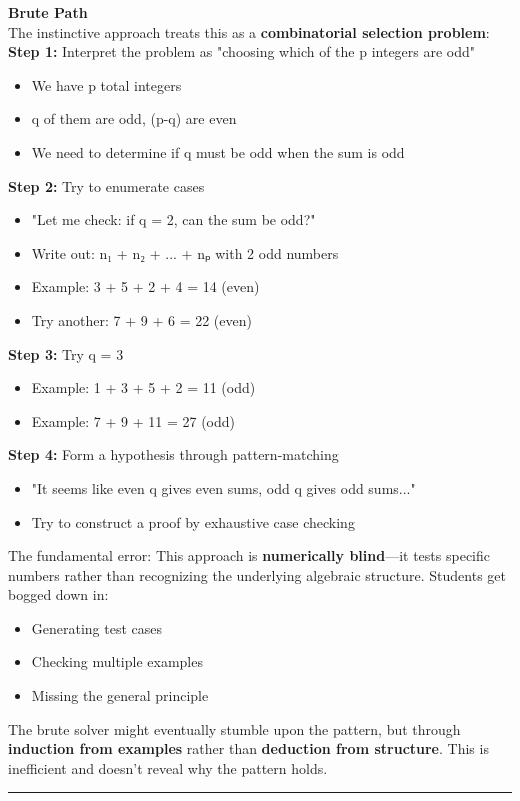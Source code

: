 \documentclass{article}
\begin{document}
\noindent \textbf{Brute Path} \\
The instinctive approach treats this as a \textbf{combinatorial selection problem}: \\
\textbf{Step 1:} Interpret the problem as "choosing which of the p integers are odd"
\begin{itemize}
    \item We have p total integers
    \item q of them are odd, (p-q) are even
    \item We need to determine if q must be odd when the sum is odd
\end{itemize}
\textbf{Step 2:} Try to enumerate cases
\begin{itemize}
    \item "Let me check: if q = 2, can the sum be odd?"
    \item Write out: n₁ + n₂ + ... + nₚ with 2 odd numbers
    \item Example: 3 + 5 + 2 + 4 = 14 (even) \texttimes
    \item Try another: 7 + 9 + 6 = 22 (even) \texttimes
\end{itemize}
\textbf{Step 3:} Try q = 3
\begin{itemize}
    \item Example: 1 + 3 + 5 + 2 = 11 (odd) \checkmark
    \item Example: 7 + 9 + 11 = 27 (odd) \checkmark
\end{itemize}
\textbf{Step 4:} Form a hypothesis through pattern-matching
\begin{itemize}
    \item "It seems like even q gives even sums, odd q gives odd sums..."
    \item Try to construct a proof by exhaustive case checking
\end{itemize}
The fundamental error: This approach is \textbf{numerically blind}—it tests specific numbers rather than recognizing the underlying algebraic structure. Students get bogged down in:
\begin{itemize}
    \item Generating test cases
    \item Checking multiple examples
    \item Missing the general principle
\end{itemize}
The brute solver might eventually stumble upon the pattern, but through \textbf{induction from examples} rather than \textbf{deduction from structure}. This is inefficient and doesn't reveal why the pattern holds. \\
\noindent \rule{\textwidth}{0.4pt}
\end{document}
